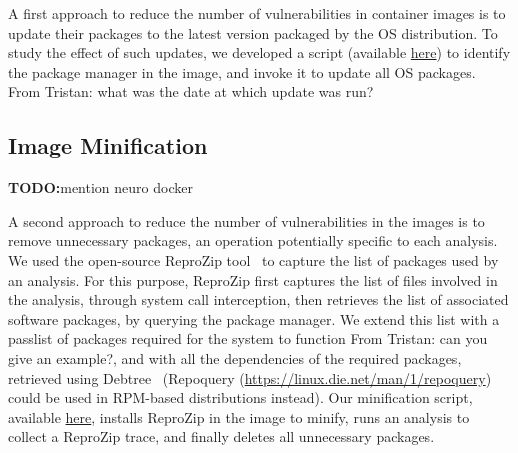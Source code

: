 \documentclass[a4paper,num-refs]{oup-contemporary}
\newcommand{\todo}[1]{\color{red}\textbf{TODO:}#1\color{black}}
\newcommand{\reprozip}[0]{ReproZip\xspace}
\newcommand{\tristan}[1]{\color{blue}From Tristan: #1\color{black}}
\begin{document}
A first approach to reduce the number of vulnerabilities in container
images is to update their packages to the latest version packaged by the OS
distribution. To study the effect of such updates, we developed a script
(available
\href{https://github.com/big-data-lab-team/container-vulnerabilities-paper/blob/master/Scripts/update}{here})
to identify the package manager in the image, and invoke it to update all
OS packages. \tristan{what was the date at which update was run?}

\subsection{Image Minification}


\todo{mention neuro docker}

A second approach to reduce the number of vulnerabilities in the images is
to remove unnecessary packages, an operation potentially specific to each
analysis. We used the open-source \reprozip tool~\cite{rampin2016reprozip}
to capture the list of packages used by an analysis. For this purpose,
\reprozip first captures the list of files involved in the analysis,
through system call interception, then retrieves the list of associated
software packages, by querying the package manager. We extend this list
with a passlist of packages required for the system to function
\tristan{can you give an example?}, and with all the dependencies of the
required packages, retrieved using Debtree~\cite{debtree} (Repoquery
(\url{https://linux.die.net/man/1/repoquery}) could be used in RPM-based
distributions instead). Our minification script, available
\href{https://github.com/big-data-lab-team/container-vulnerabilities-paper/tree/master/Scripts/minification}{here},
installs \reprozip in the image to minify, runs an analysis to collect a
\reprozip trace, and finally deletes all unnecessary packages. 
\end{document}
